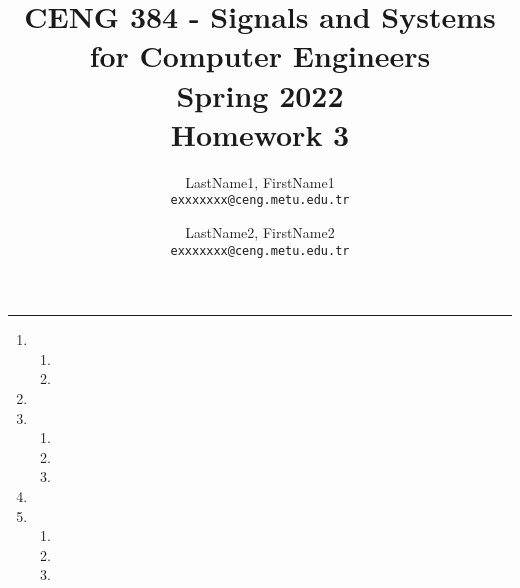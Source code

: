 \documentclass[10pt,a4paper, margin=1in]{article}
\author{
  LastName1, FirstName1\\
  \texttt{exxxxxxx@ceng.metu.edu.tr}
  \and
  LastName2, FirstName2\\
  \texttt{exxxxxxx@ceng.metu.edu.tr}
}
\title{CENG 384 - Signals and Systems for Computer Engineers \\
Spring 2022 \\
Homework 3}
\begin{document}
\maketitle



\noindent\rule{19cm}{1.2pt}

\begin{enumerate}

\item %
    \begin{enumerate}
    \item %
    \item %
    \end{enumerate}

\item %

\item %
    \begin{enumerate}
    \item %
    \item %
    \item %
    \end{enumerate}

\item %

\item %
    \begin{enumerate}   
    \item %
    \item %
    \item %
    \end{enumerate}

 

\end{enumerate}
\end{document}
